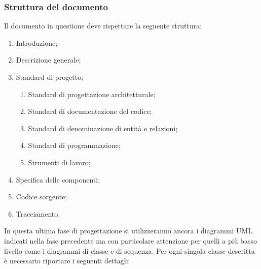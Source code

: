 	\subsubsection{Struttura del documento}
	Il documento in questione deve rispettare la seguente struttura:
	\begin{enumerate}
	\item Introduzione;
	\item Descrizione generale;
	\item Standard di progetto;
	\begin{enumerate}
	\item Standard di progettazione architetturale;
	\item Standard di documentazione del codice;
	\item Standard di denominazione di entità e relazioni;
	\item Standard di programmazione;
	\item Strumenti di lavoro;
	\end{enumerate}
	\item Specifica delle componenti;
	\item Codice sorgente;
	\item Tracciamento.
	\end{enumerate}
	In questa ultima fase di progettazione si utilizzeranno ancora i diagrammi UML indicati nella fase precedente ma con particolare attenzione per quelli a più basso livello come i diagrammi di classe e di sequenza.
	Per ogni singola classe descritta è necessario riportare i seguenti dettagli:

